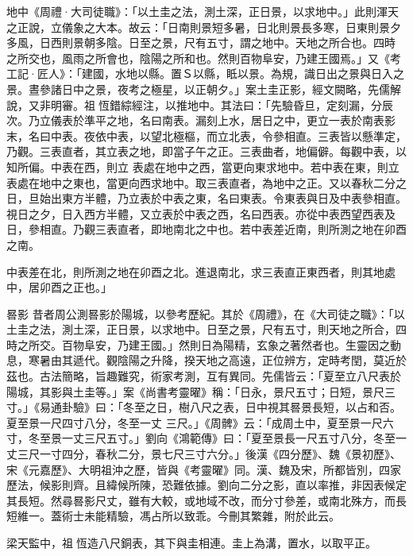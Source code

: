 \begin{pinyinscope}
 地中《周禮·大司徒職》：「以土圭之法，測土深，正日景，以求地中。」此則渾天之正說，立儀象之大本。故云：「日南則景短多暑，日北則景長多寒，日東則景夕多風，日西則景朝多陰。日至之景，尺有五寸，謂之地中。天地之所合也。四時
 之所交也，風雨之所會也，陰陽之所和也。然則百物阜安，乃建王國焉。」又《考工記·匠人》：「建國，水地以縣。置Ｓ以縣，眡以景。為規，識日出之景與日入之景。晝參諸日中之景，夜考之極星，以正朝夕。」案土圭正影，經文闕略，先儒解說，又非明審。祖恆錯綜經注，以推地中。其法曰：「先驗昏旦，定刻漏，分辰次。乃立儀表於準平之地，名曰南表。漏刻上水，居日之中，更立一表於南表影末，名曰中表。夜依中表，以望北極樞，而立北表，令參相直。三表皆以懸準定，乃觀。三表直者，其立表之地，即當子午之正。三表曲者，地偏僻。每觀中表，以知所偏。中表在西，則立
 表處在地中之西，當更向東求地中。若中表在東，則立表處在地中之東也，當更向西求地中。取三表直者，為地中之正。又以春秋二分之日，旦始出東方半體，乃立表於中表之東，名曰東表。令東表與日及中表參相直。視日之夕，日入西方半體，又立表於中表之西，名曰西表。亦從中表西望西表及日，參相直。乃觀三表直者，即地南北之中也。若中表差近南，則所測之地在卯酉之南。



 中表差在北，則所測之地在卯酉之北。進退南北，求三表直正東西者，則其地處中，居卯酉之正也。」



 晷影
 昔者周公測晷影於陽城，以參考歷紀。其於《周禮》，在《大司徒之職》：「以土圭之法，測土深，正日景，以求地中。日至之景，尺有五寸，則天地之所合，四時之所交。百物阜安，乃建王國。」然則日為陽精，玄象之著然者也。生靈因之動息，寒暑由其遞代。觀陰陽之升降，揆天地之高遠，正位辨方，定時考閏，莫近於茲也。古法簡略，旨趣難究，術家考測，互有異同。先儒皆云：「夏至立八尺表於陽城，其影與土圭等。」案《尚書考靈曜》稱：「日永，景尺五寸；日短，景尺三寸。」《易通卦驗》曰：「冬至之日，樹八尺之表，日中視其晷景長短，以占和否。夏至景一尺四寸八分，冬至一丈
 三尺。」《周髀》云：「成周土中，夏至景一尺六寸，冬至景一丈三尺五寸。」劉向《鴻範傳》曰：「夏至景長一尺五寸八分，冬至一丈三尺一寸四分，春秋二分，景七尺三寸六分。」後漢《四分歷》、魏《景初歷》、宋《元嘉歷》、大明祖沖之歷，皆與《考靈曜》同。漢、魏及宋，所都皆別，四家歷法，候影則齊。且緯候所陳，恐難依據。劉向二分之影，直以率推，非因表候定其長短。然尋晷影尺丈，雖有大較，或地域不改，而分寸參差，或南北殊方，而長短維一。蓋術士未能精驗，馮占所以致乖。今刪其繁雜，附於此云。



 梁天監中，祖恆造八尺銅表，其下與圭相連。圭上為溝，置水，以取平正。




\end{pinyinscope}
